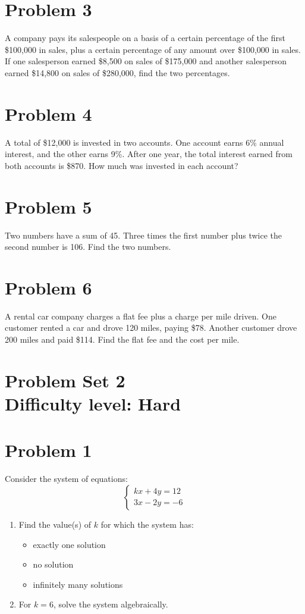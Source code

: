 \documentclass[12pt]{article}
\begin{document}
\section*{Problem 3}
A company pays its salespeople on a basis of a certain percentage of the first \$100{,}000 in sales, plus a certain percentage of any amount over \$100{,}000 in sales. If one salesperson earned \$8{,}500 on sales of \$175{,}000 and another salesperson earned \$14{,}800 on sales of \$280{,}000, find the two percentages.

\section*{Problem 4}
A total of \$12,000 is invested in two accounts. One account earns 6\% annual interest, and the other earns 9\%. After one year, the total interest earned from both accounts is \$870. How much was invested in each account?

\section*{Problem 5}
Two numbers have a sum of 45. Three times the first number plus twice the second number is 106. Find the two numbers.

\section*{Problem 6}
A rental car company charges a flat fee plus a charge per mile driven. One customer rented a car and drove 120 miles, paying \$78. Another customer drove 200 miles and paid \$114. Find the flat fee and the cost per mile.

\section*{Problem Set 2\\Difficulty level: Hard}
\section*{Problem 1}
Consider the system of equations:
\[
\begin{cases}
kx + 4y = 12 \\
3x - 2y = -6
\end{cases}
\]

\begin{enumerate}[label=(\roman*)]
    \item Find the value(s) of \( k \) for which the system has:
    \begin{itemize}
        \item exactly one solution
        \item no solution
        \item infinitely many solutions
    \end{itemize}
    \item For \( k = 6 \), solve the system algebraically.
\end{enumerate}
\end{document}
